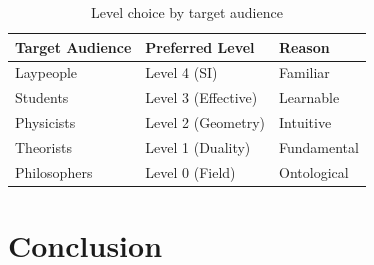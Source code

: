 	\begin{table}[H]
		\centering
		\begin{tabular}{lll}
			\toprule
			\textbf{Target Audience} & \textbf{Preferred Level} & \textbf{Reason} \\
			\midrule
			Laypeople & Level 4 (SI) & Familiar \\
			Students & Level 3 (Effective) & Learnable \\
			Physicists & Level 2 (Geometry) & Intuitive \\
			Theorists & Level 1 (Duality) & Fundamental \\
			Philosophers & Level 0 (Field) & Ontological \\
			\bottomrule
		\end{tabular}
		\caption{Level choice by target audience}
	\end{table}
	
	\section{Conclusion}
	
